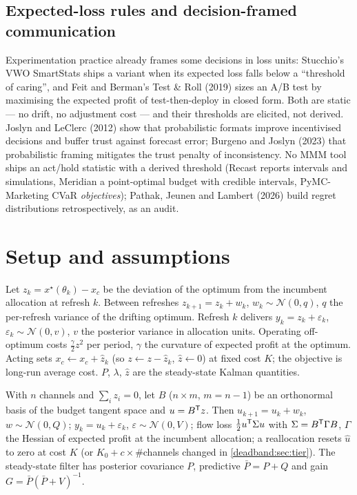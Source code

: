 \subsection{Expected-loss rules and decision-framed communication}

Experimentation practice already frames some decisions in loss units: Stucchio's VWO SmartStats ships a variant when its expected loss falls below a ``threshold of caring'', and Feit and Berman's Test \& Roll (2019) sizes an A/B test by maximising the expected profit of test-then-deploy in closed form. Both are static --- no drift, no adjustment cost --- and their thresholds are elicited, not derived. Joslyn and LeClerc (2012) show that probabilistic formats improve incentivised decisions and buffer trust against forecast error; Burgeno and Joslyn (2023) that probabilistic framing mitigates the trust penalty of inconsistency. No MMM tool ships an act/hold statistic with a derived threshold (Recast reports intervals and simulations, Meridian a point-optimal budget with credible intervals, PyMC-Marketing CVaR \emph{objectives}); Pathak, Jeunen and Lambert (2026) build regret distributions retrospectively, as an audit.

\section{Setup and assumptions}

\begin{definition}
\label{deadband:def:scalar}
Let $z_k = x^\star(\theta_k) - x_c$ be the deviation of the optimum from the incumbent allocation at refresh $k$. Between refreshes $z_{k+1} = z_k + w_k$, $w_k \sim \mathcal N(0,q)$, $q$ the per-refresh variance of the drifting optimum. Refresh $k$ delivers $y_k = z_k + \varepsilon_k$, $\varepsilon_k \sim \mathcal N(0,v)$, $v$ the posterior variance in allocation units. Operating off-optimum costs $\tfrac{\gamma}{2}z^2$ per period, $\gamma$ the curvature of expected profit at the optimum. Acting sets $x_c \leftarrow x_c + \hat z_k$ (so $z \leftarrow z - \hat z_k$, $\hat z \leftarrow 0$) at fixed cost $K$; the objective is long-run average cost. $P$, $\lambda$, $\hat z$ are the steady-state Kalman quantities.
\end{definition}

\begin{definition}
\label{deadband:def:vector}
With $n$ channels and $\sum_i z_i = 0$, let $B$ ($n \times m$, $m = n-1$) be an orthonormal basis of the budget tangent space and $u = B^{\mathsf{T}} z$. Then $u_{k+1} = u_k + w_k$, $w \sim \mathcal N(0,Q)$; $y_k = u_k + \varepsilon_k$, $\varepsilon \sim \mathcal N(0,V)$; flow loss $\tfrac12 u^{\mathsf{T}}\Sigma u$ with $\Sigma = B^{\mathsf{T}}\Gamma B$, $\Gamma$ the Hessian of expected profit at the incumbent allocation; a reallocation resets $\hat u$ to zero at cost $K$ (or $K_0 + c\times$\#channels changed in \cref{deadband:sec:tier}). The steady-state filter has posterior covariance $P$, predictive $\bar P = P + Q$ and gain $G = \bar P(\bar P + V)^{-1}$.
\end{definition}

